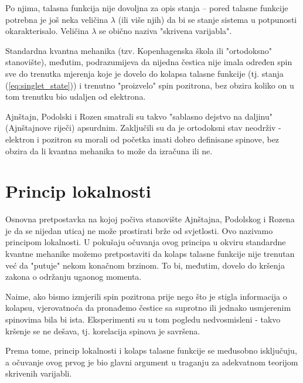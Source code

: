 Po njima, talasna funkcija nije dovoljna za opis stanja – pored talasne funkcije potrebna je još neka veličina $\lambda$ (ili više njih) da bi se stanje sistema u potpunosti okarakterisalo. Veličina $\lambda$ se obično naziva "skrivena varijabla".

Standardna kvantna mehanika (tzv. Kopenhagenska škola ili "ortodoksno" stanovište), međutim,  podrazumijeva da nijedna čestica nije imala određen spin sve do trenutka mjerenja koje je dovelo do kolapsa talasne funkcije (tj. stanja (\ref{eq:singlet_state})) i trenutno "proizvelo" spin pozitrona, bez obzira koliko on u tom trenutku bio udaljen od elektrona.

Ajnštajn, Podolski i Rozen smatrali su takvo "sablasno dejstvo na daljinu" (Ajnštajnove riječi) apsurdnim. Zaključili su da je ortodoksni stav neodrživ - elektron i pozitron su morali od početka imati dobro definisane spinove, bez obzira da li kvantna mehanika to može da izračuna ili ne.

\section{Princip lokalnosti}

Osnovna pretpostavka na kojoj počiva stanovište Ajnštajna, Podolskog i Rozena je da se nijedan uticaj ne može prostirati brže od svjetlosti. Ovo nazivamo principom lokalnosti. U pokušaju očuvanja ovog principa u okviru standardne kvantne mehanike možemo pretpostaviti da kolaps talasne funkcije nije trenutan već da "putuje" nekom konačnom brzinom. To bi, međutim, dovelo do kršenja zakona o održanju ugaonog momenta.

Naime, ako bismo izmjerili spin pozitrona prije nego što je stigla informacija o kolapsu, vjerovatnoća da pronađemo čestice sa suprotno ili jednako usmjerenim spinovima bila bi ista. Eksperimenti su u tom pogledu nedvosmisleni - takvo kršenje se ne dešava, tj. korelacija spinova je savršena.

Prema tome, princip lokalnosti i kolaps talasne funkcije se međusobno isključuju, a očuvanje ovog prvog je bio glavni argument u traganju za adekvatnom teorijom skrivenih varijabli.
